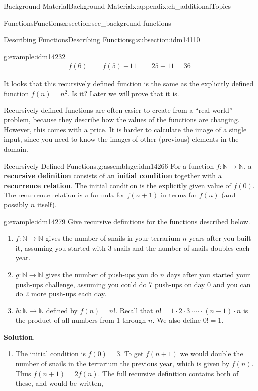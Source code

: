 \documentclass[oneside,10pt,]{book}
\newcommand{\terminology}[1]{\textbf{#1}}
\numberwithin{equation}{chapter}
\def\N{\mathbb N}
\newcommand{\amp}{&}
\begin{document}
\begin{appendixptx}{Background Material}{}{Background Material}{}{}{x:appendix:ch_additionalTopics}
\begin{sectionptx}{Functions}{}{Functions}{}{}{x:section:sec_background-functions}
\begin{subsectionptx}{Describing Functions}{}{Describing Functions}{}{}{g:subsection:idm14110}
\begin{example}{}{g:example:idm14232}
\begin{align*}
f(6) = \amp f(5) + 11 = \amp 25 + 11 = 36
\end{align*}
%
\par
It looks that this recursively defined function is the same as the explicitly defined function \(f(n) = n^2\).  Is it?  Later we will prove that it is.%
\end{example}
Recursively defined functions are often easier to create from a ``real world'' problem, because they describe how the values of the functions are changing.  However, this comes with a price. It is harder to calculate the image of a single input, since you need to know the images of other (previous) elements in the domain.%
\begin{assemblage}{Recursively Defined Functions.}{g:assemblage:idm14266}%
For a function \(f:\N \to \N\), a \terminology{recursive definition} consists of an \terminology{initial condition} together with a \terminology{recurrence relation}.  The initial condition is the explicitly given value of \(f(0)\). The recurrence relation is a formula for \(f(n+1)\) in terms for \(f(n)\) (and possibly \(n\) itself).%
\end{assemblage}
\begin{example}{}{g:example:idm14279}%
Give recursive definitions for the functions described below.%
\begin{enumerate}
\item{}\(f:\N \to \N\) gives the number of snails in your terrarium \(n\) years after you built it, assuming you started with 3 snails and the number of snails doubles each year.%
\item{}\(g:\N \to \N\) gives the number of push-ups you do \(n\) days after you started your push-ups challenge, assuming you could do 7 push-ups on day 0 and you can do 2 more push-ups each day.%
\item{}\(h:\N \to \N\) defined by \(f(n) = n!\).  Recall that \(n! = 1 \cdot 2 \cdot 3 \cdot \cdots \cdot (n-1)\cdot n\) is the product of all numbers from \(1\) through \(n\).  We also define \(0! = 1\).%
\end{enumerate}
%
\par\smallskip%
\noindent\textbf{Solution}.\hypertarget{g:solution:idm14299}{}\quad{}%
\begin{enumerate}
\item{}The initial condition is \(f(0) = 3\).  To get \(f(n+1)\) we would double the number of snails in the terrarium the previous year, which is given by \(f(n)\).  Thus \(f(n+1) = 2f(n)\).  The full recursive definition contains both of these, and would be written,%

\end{enumerate}
\end{example}
\end{subsectionptx}
\end{sectionptx}
\end{appendixptx}
\end{document}
